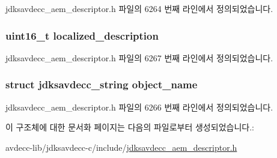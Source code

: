 jdksavdecc\+\_\+aem\+\_\+descriptor.\+h 파일의 6264 번째 라인에서 정의되었습니다.

\subsubsection[{\texorpdfstring{localized\+\_\+description}{localized_description}}]{\setlength{\rightskip}{0pt plus 5cm}uint16\+\_\+t localized\+\_\+description}\hypertarget{structjdksavdecc__descriptor__configuration_a0926f846ca65a83ad5bb06b4aff8f408}{}\label{structjdksavdecc__descriptor__configuration_a0926f846ca65a83ad5bb06b4aff8f408}


jdksavdecc\+\_\+aem\+\_\+descriptor.\+h 파일의 6267 번째 라인에서 정의되었습니다.

\subsubsection[{\texorpdfstring{object\+\_\+name}{object_name}}]{\setlength{\rightskip}{0pt plus 5cm}struct {\bf jdksavdecc\+\_\+string} object\+\_\+name}\hypertarget{structjdksavdecc__descriptor__configuration_a7d1f5945a13863b1762fc6db74fa8f80}{}\label{structjdksavdecc__descriptor__configuration_a7d1f5945a13863b1762fc6db74fa8f80}


jdksavdecc\+\_\+aem\+\_\+descriptor.\+h 파일의 6266 번째 라인에서 정의되었습니다.



이 구조체에 대한 문서화 페이지는 다음의 파일로부터 생성되었습니다.\+:\begin{DoxyCompactItemize}
\item 
avdecc-\/lib/jdksavdecc-\/c/include/\hyperlink{jdksavdecc__aem__descriptor_8h}{jdksavdecc\+\_\+aem\+\_\+descriptor.\+h}\end{DoxyCompactItemize}
